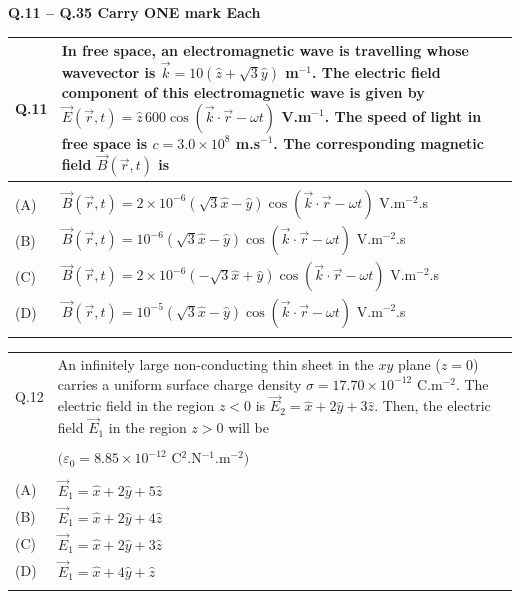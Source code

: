 \documentclass[12pt,a4paper]{article}
\begin{document}
\newpage

\textbf{Q.11 -- Q.35 Carry ONE mark Each}

\vspace{0.5em}

\begin{tabular}{|p{1cm}|p{12cm}|}
\hline
Q.11 & In free space, an electromagnetic wave is travelling whose wavevector is
$\vec{k} = 10(\hat{z} + \sqrt{3}\hat{y})$ m$^{-1}$. The electric field component of this electromagnetic wave is
given by $\vec{E}(\vec{r},t) = \hat{z}\, 600\cos(\vec{k}\cdot\vec{r} - \omega t)$ V.m$^{-1}$. The speed of light in free space is
$c = 3.0 \times 10^8$ m.s$^{-1}$. The corresponding magnetic field $\vec{B}(\vec{r},t)$ is \\
\hline
& \rule{0pt}{0.8cm} \\
\hline
(A) & $\vec{B}(\vec{r},t) = 2 \times 10^{-6}(\sqrt{3}\hat{x} - \hat{y})\cos(\vec{k}\cdot\vec{r} - \omega t)$ V.m$^{-2}$.s \\
\hline
(B) & $\vec{B}(\vec{r},t) = 10^{-6}(\sqrt{3}\hat{x} - \hat{y})\cos(\vec{k}\cdot\vec{r} - \omega t)$ V.m$^{-2}$.s \\
\hline
(C) & $\vec{B}(\vec{r},t) = 2 \times 10^{-6}(-\sqrt{3}\hat{x} + \hat{y})\cos(\vec{k}\cdot\vec{r} - \omega t)$ V.m$^{-2}$.s \\
\hline
(D) & $\vec{B}(\vec{r},t) = 10^{-5}(\sqrt{3}\hat{x} - \hat{y})\cos(\vec{k}\cdot\vec{r} - \omega t)$ V.m$^{-2}$.s \\
\hline
& \rule{0pt}{0.8cm} \\
\hline
\end{tabular}

\vspace{1em}

\begin{tabular}{|p{1cm}|p{12cm}|}
\hline
Q.12 & An infinitely large non-conducting thin sheet in the $xy$ plane ($z{=}0$) carries a uniform
surface charge density $\sigma = 17.70 \times 10^{-12}$ C.m$^{-2}$. The electric field in the region $z < 0$
is $\vec{E}_2 = \hat{x} + 2\hat{y} + 3\hat{z}$. Then, the electric field $\vec{E}_1$ in the region $z > 0$ will be \\
& \\
& $(\varepsilon_0 = 8.85 \times 10^{-12}$ C$^2$.N$^{-1}$.m$^{-2})$ \\
\hline
& \rule{0pt}{0.8cm} \\
\hline
(A) & $\vec{E}_1 = \hat{x} + 2\hat{y} + 5\hat{z}$ \\
\hline
(B) & $\vec{E}_1 = \hat{x} + 2\hat{y} + 4\hat{z}$ \\
\hline
(C) & $\vec{E}_1 = \hat{x} + 2\hat{y} + 3\hat{z}$ \\
\hline
(D) & $\vec{E}_1 = \hat{x} + 4\hat{y} + \hat{z}$ \\
\hline
& \rule{0pt}{0.8cm} \\
\hline
\end{tabular}
\end{document}
